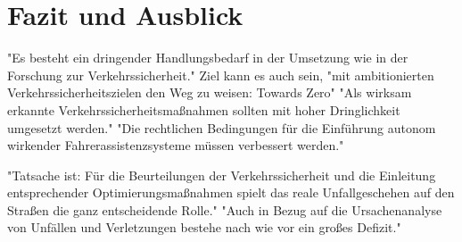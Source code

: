 
\chapter{Fazit und Ausblick}\label{chapter:Diskussion}

"Es besteht ein dringender Handlungsbedarf in der Umsetzung wie in der Forschung zur Verkehrssicherheit." Ziel kann es auch sein, "mit ambitionierten Verkehrssicherheitszielen den Weg zu weisen: Towards Zero"
"Als wirksam erkannte Verkehrssicherheitsmaßnahmen sollten mit hoher Dringlichkeit umgesetzt werden."
"Die rechtlichen Bedingungen für die Einführung autonom wirkender Fahrerassistenzsysteme müssen verbessert werden." \parencite[S.170]{WissenschaflicherBeiratbeimBundesministerfurVerkehrBauundStadtentwicklung.2011b}




"Tatsache ist: Für die Beurteilungen der Verkehrssicherheit und die Einleitung entsprechender Optimierungsmaßnahmen spielt das reale Unfallgeschehen auf den Straßen die ganz entscheidende Rolle." \parencite[S.12]{DEKRA.2017}
"Auch in Bezug auf die Ursachenanalyse von Unfällen und Verletzungen bestehe nach wie vor ein großes Defizit." \parencite[S.14]{DEKRA.2017}


